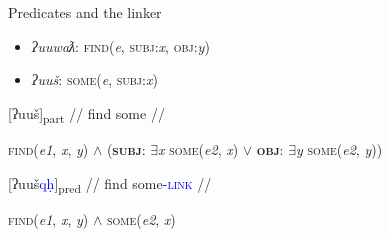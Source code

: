 \begin{frame}{Predicates and the linker}

\begin{itemize}
\item \textit{ʔuuwaƛ}: \textsc{find}(\textit{e}, \textsc{subj}:\textit{x}, \textsc{obj}:\textit{y})
\item \textit{ʔuuš}: \textsc{some}(\textit{e}, \textsc{subj}:\textit{x})
\end{itemize}

\pause

\ex[exno=27]
\begingl
{} {[ʔuuš]\textsubscript{part}} //
\glb find some //
\endgl \label{ex:findsomething2}
\xe

\vspace{-15pt}

\hspace{25pt} \textsc{find}(\textit{e1}, \textit{x}, \textit{y}) $\land$ (\textbf{\textsc{subj}}: $\exists$\textit{x} \textsc{some}(\textit{e2}, \textit{x}) $\lor$ \textbf{\textsc{obj}}: $\exists$\textit{y} \textsc{some}(\textit{e2}, \textit{y}))

\pause

\ex[exno=28]
\begingl
{} {[ʔuuš\textcolor{blue}{qḥ}]\textsubscript{pred}} //
\glb find some\textcolor{blue}{-\textsc{link}} //
\endgl \label{ex:findsomeone}
\xe

\vspace{-15pt}

\hspace{25pt} \textsc{find}(\textit{e1}, \textit{x}, \textit{y}) $\land$ \textsc{some}(\textit{e2}, \textit{x})

\end{frame}

